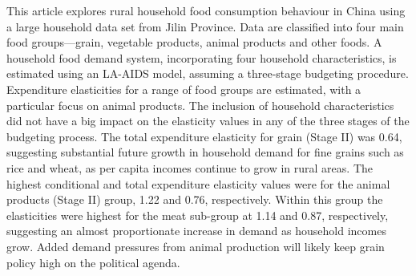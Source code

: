  This article explores rural household food consumption behaviour in China using a large household data set from Jilin Province. Data are classified into four main food groups—grain, vegetable products, animal products and other foods. A household food demand system, incorporating four household characteristics, is estimated using an LA-AIDS model, assuming a three-stage budgeting procedure. Expenditure elasticities for a range of food groups are estimated, with a particular focus on animal products. The inclusion of household characteristics did not have a big impact on the elasticity values in any of the three stages of the budgeting process. The total expenditure elasticity for grain (Stage II) was 0.64, suggesting substantial future growth in household demand for fine grains such as rice and wheat, as per capita incomes continue to grow in rural areas. The highest conditional and total expenditure elasticity values were for the animal products (Stage II) group, 1.22 and 0.76, respectively. Within this group the elasticities were highest for the meat sub-group at 1.14 and 0.87, respectively, suggesting an almost proportionate increase in demand as household incomes grow. Added demand pressures from animal production will likely keep grain policy high on the political agenda. 